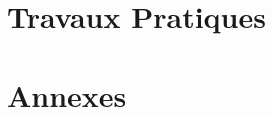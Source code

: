 \part{Travaux Pratiques}
\def\prefix{\textsc{tp}}
\renewcommand{\chaptername}{Travaux pratiques}


{
	\minitoc
	\renewcommand{\cwd}{../tps/tp01/}
	\addmacros{
		
		
		
	}
	\def\addmacros#1{#1}
}
{
	\def\addmacros#1{#1}
}
{
	\minitoc
	\renewcommand{\cwd}{../tps/tp03/}
	\addmacros{
	}
	\def\addmacros#1{#1}
}
{
	\def\addmacros#1{#1}
}
{
	\def\addmacros#1{#1}
}
{
	\def\addmacros#1{#1}
}
{
	\minitoc
	\renewcommand{\cwd}{../tps/tp07/}
	\addmacros{
		
	}
	\def\addmacros#1{#1}
}
{
	\def\addmacros#1{#1}
}
{
	\def\addmacros#1{#1}
}
{
	\def\addmacros#1{#1}
}
\def\prefix{\textsc{tp bonus}}
{
	\def\addmacros#1{#1}
}
\def\prefix{\textsc{tp bonus}}
{
	\def\addmacros#1{#1}
}


\part{Annexes}
\def\prefix{Annexe}
\renewcommand{\chaptername}{Annexe}
\useroman



